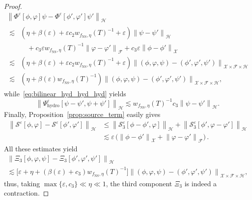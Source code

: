 \documentclass[10pt]{amsart}
\theoremstyle{definition}\newtheorem{defi}[theo]{Definition}\newtheorem{rema}[theo]{Remark}\newtheorem{exam}[theo]{Example}\newtheorem{exem}[theo]{Example}\newtheorem{nota}[theo]{Notation}
\newcommand{\ns}{\mathrm{NS}}
\newcommand{\hyd}{\mathrm{hydro}}
\renewcommand{\SS}{\mathcal{S}}
\newcommand{\FFF}{\mathscr{F}}
\newcommand{\HHH}{\mathscr{H}}
\newcommand{\GGG}{\mathscr{X}}
\newcommand{\SSSs}{\HHH}
\newcommand{\SSSl}{\GGG}
\newcommand{\SSSm}{\FFF}
\renewcommand*\leq{\leqslant}
\newcommand*\eps{{\varepsilon}}
\begin{document}
\begin{proof}
\begin{multline*}
\left\| \Phi^\eps\left[\phi, \varphi\right] \psi - \Phi^\eps\left[\phi', \varphi'\right] \psi' \right\|_{ \SSSs } \\
\begin{aligned}
\lesssim & \left(\eta + \beta(\eps) + \eps c_2 w_{ f_\ns, \eta }(T)^{-1} + \eps\right) \left\| \psi - \psi' \right\|_{ \SSSs } \\
&\quad + c_3 \eps w_{ f_\ns, \eta }(T)^{-1} \left\| \varphi - \varphi' \right\|_{ \SSSm } + c_3 \eps \left\| \phi - \phi' \right\|_{ \SSSl } \\
\lesssim & \left(\eta + \beta(\eps) + \eps c_2 w_{ f_\ns, \eta }(T)^{-1} + \eps \right) \left\| (\phi, \varphi, \psi) - \left(\phi', \varphi', \psi'\right) \right\|_{ \SSSl \times \SSSm \times \SSSs } \\
\lesssim & \left(\eta + \beta(\eps) w_{ f_\ns, \eta }(T)^{-1} \right) \left\| (\phi, \varphi, \psi) - \left(\phi', \varphi', \psi'\right) \right\|_{ \SSSl \times \SSSm \times \SSSs },
\end{aligned}
\end{multline*}
while~\eqref{eq:bilinear_hyd_hyd_hyd} yields
\[
\left\| \Psi^\eps_\hyd\left[\psi - \psi', \psi + \psi'\right] \right\|_{ \SSSs } \lesssim w_{f_\ns, \eta}(T)^{-1} c_3 \left\| \psi - \psi' \right\|_{ \SSSs }.
\]
Finally, Proposition~\ref{prop:source_term} easily gives
\begin{align*}
\left\| \SS^\eps[\phi,\varphi] -\SS^\eps\left[\phi',\varphi'\right]\right\|_{\SSSs} & \leq \left\| \SS_3^\eps\left[\phi-\phi',\varphi\right]\right\|_{\SSSs} + \left\| \SS_3^\eps\left[\phi',\varphi-\varphi'\right]\right\|_{\SSSs} \\
& \lesssim \eps\,\bigg(\left\| \phi-\phi'\right\|_{\SSSl} + \left\| \varphi-\varphi'\right\|_{\SSSm}\bigg)\,.
\end{align*}
All these estimates yield
\begin{multline*}
\left\| \Xi_3\left[\phi, \varphi, \psi\right]  - \Xi_3\left[\phi', \varphi', \psi'\right] \right\|_{ \SSSs } \\
 \lesssim \Big[{\eps +} \eta + \left(\beta(\eps) + c_3 \right) w_{ f_\ns, \eta }(T)^{-1} \Big] \left\| \left(\phi, \varphi, \psi\right) - \left(\phi', \varphi', \psi'\right) \right\|_{ \SSSl \times \SSSm \times \SSSs },
\end{multline*}
thus, taking $\max\{ \eps, c_3 \} \ll \eta \ll 1$, the third component $\Xi_3$ is indeed a contraction.
\end{proof}
\end{document}
